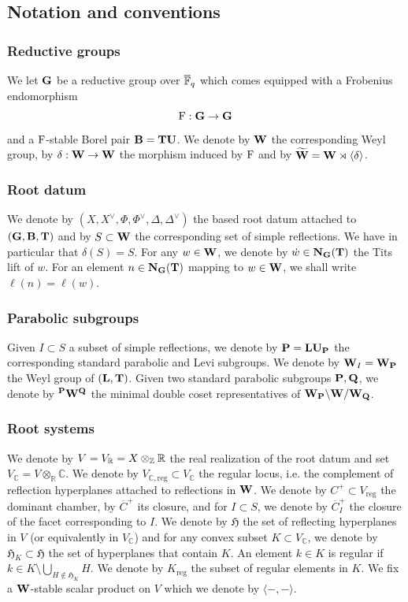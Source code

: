 \documentclass[article, 10pt, oneside, reqno]{amsart}
\theoremstyle{plain}
\theoremstyle{definition}
\theoremstyle{remark}
\newcommand{\C}{\mathbb{C}}
\newcommand{\reg}{\mathrm{reg}}
\newcommand{\Rbb}{\mathbb{R}}
\newcommand{\Hfrak}{\mathfrak{H}}
\begin{document}
\subsection{Notation and conventions}

\subsubsection{Reductive groups} We let $\mathbf{G}$ be a reductive group over $\overline{\mathbb{F}}_q$ which comes equipped with a Frobenius endomorphism 
$$ \mathrm{F} : \mathbf{G} \to \mathbf{G}$$ 
and a $\mathrm{F}$-stable Borel pair $\mathbf{B} = \mathbf{T}\mathbf{U}$. We denote by $\mathbf{W}$ the corresponding Weyl group, by $\delta : \mathbf{W} \to \mathbf{W}$ the morphism induced by $\mathrm{F}$ and by $\widetilde{\mathbf{W}} = \mathbf{W} \rtimes \langle \delta \rangle$. 

\subsubsection{Root datum}
We denote by $(X,X^{\vee}, \Phi, \Phi^{\vee}, \Delta, \Delta^{\vee})$ the based root datum attached to $(\mathbf{G}, \mathbf{B}, \mathbf{T})$ and by $S \subset \mathbf{W}$ the corresponding set of simple reflections. We have in particular that $\delta(S) = S$. For any $w\in \mathbf{W}$, we denote by $\dot{w} \in \mathbf{N}_{\mathbf{G}}(\mathbf{T})$ the Tits lift of $w$. For an element $n \in \mathbf{N}_{\mathbf{G}}(\mathbf{T})$ mapping to $w \in \mathbf{W}$, we shall write $\ell(n)= \ell(w)$. 


\subsubsection{Parabolic subgroups}

Given $I \subset S$ a subset of simple reflections, we denote by $\mathbf{P} = \mathbf{L}\mathbf{U}_{\mathbf{P}}$ the corresponding standard parabolic and Levi subgroups. We denote by $\mathbf{W}_I = \mathbf{W}_{\mathbf{P}}$ the Weyl group of $(\mathbf{L}, \mathbf{T})$. Given two standard parabolic subgroups $\mathbf{P}, \mathbf{Q}$, we denote by ${^{\mathbf{P}}}\mathbf{W}^{\mathbf{Q}}$ the minimal double coset representatives of $\mathbf{W}_{\mathbf{P}}\backslash \mathbf{W}/\mathbf{W}_{\mathbf{Q}}$.

\subsubsection{Root systems}

We denote by $V = V_{\Rbb} = X \otimes_{\Z} \Rbb$ the real realization of the root datum and set $V_{\C} = V \otimes_{\Rbb} \C$. We denote by $V_{\C, \reg} \subset V_{\C}$ the regular locus, i.e. the complement of reflection hyperplanes attached to reflections in $\mathbf{W}$. We denote by $C^+ \subset V_{\reg}$ the dominant chamber, by $\overline{C}^+$ its closure, and for $I \subset S$, we denote by $\overline{C}^+_I$ the closure of the facet corresponding to $I$. We denote by $\Hfrak$ the set of reflecting hyperplanes in $V$ (or equivalently in $V_{\C}$) and for any convex subset $K \subset V_{\C}$, we denote by $\Hfrak_K \subset \Hfrak$ the set of hyperplanes that contain $K$. An element $k \in K$ is regular if $k \in K \setminus \bigcup_{H \not \in \Hfrak_K} H$. We denote by $K_{\reg}$ the subset of regular elements in $K$. We fix a $\mathbf{W}$-stable scalar product on $V$ which we denote by $\langle - ,- \rangle$.
\end{document}
